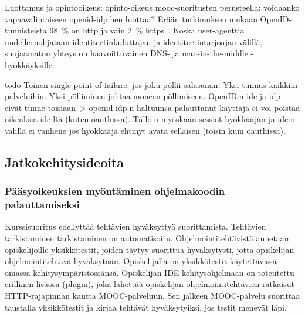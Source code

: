 \documentclass[finnish,gradu]{tktltiki}
\begin{document}
  Luottamus ja opintooikeus:
  opinto-oikeus mooc-suoritusten perusteella: voidaanko vapaavalintaiseen openid-idp:hen luottaa?
  Erään tutkimuksen mukaan OpenID-tunnisteista 98~\% on http ja vain 2~\% https~\cite{openid_identifier_survey_2011}.
  Koska user-agenttia uudelleenohjataan identiteetinkuluttajan ja identiteetintarjoajan välillä, suojaamaton yhteys on haavoittuvainen DNS- ja man-in-the-middle -hyökkäyksille.


  todo
  Toinen single point of failure: jos joku pöllii salasanan. Yksi tunnus kaikkiin palveluihin. Yksi pölliminen johtaa moneen pöllimiseen. OpenID:n idc ja idp eivät tunne toisiaan--> openid-idp:n haltuunsa palauttanut käyttäjä ei voi poistaa oikeuksia idc:ltä (kuten oauthissa). Tällöin myöskään sessiot hyökkääjän ja idc:n välillä ei vanhene jos hyökkääjä ehtinyt avata sellaisen (toisin kuin oauthissa).







  \subsection{Jatkokehitysideoita} %
  \label{sub:jatkokehitysideoita}

  \subsubsection{Pääsyoikeuksien myöntäminen ohjelmakoodin palauttamiseksi} %
  \label{ssub:pääsyoikeuksien_myöntäminen_ohjelmakoodin_palauttamiseksi}

  Kurssisuoritus edellyttää tehtävien hyväksyttyä suorittamista. Tehtävien tarkistaminen tarkistaminen on automatisoitu. Ohjelmointitehtävistä annetaan opiskelijoille yksikkötestit, joiden täytyy suorittua hyväksytysti, jotta opiskelijan ohjelmointitehtävä hyväksytään. Opiskelijalla on yksikkötestit käytettävissä omassa kehitysympäristössänsä. Opiskelijan IDE-kehitysohjelmaan on toteutettu erillinen lisäosa (plugin), joka lähettää opiskelijan ohjelmointitehtävien ratkaisut HTTP-rajapinnan kautta MOOC-palveluun. Sen jälkeen MOOC-palvelu suorittaa taustalla yksikkötestit ja kirjaa tehtävät hyväksytyiksi, jos testit menevät läpi.
\end{document}
